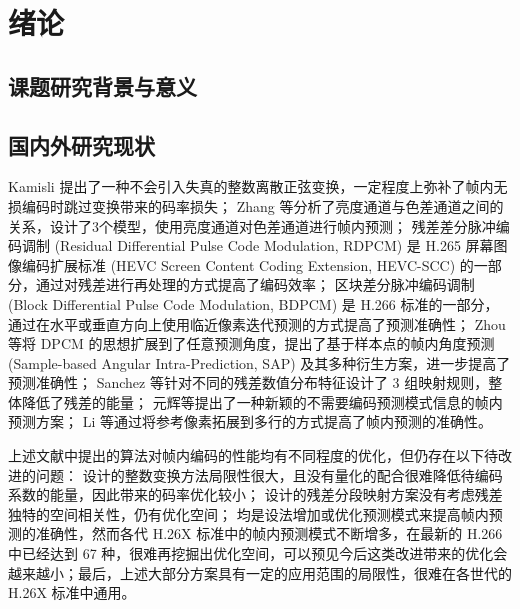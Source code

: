 \chapter{绪论}
\label{cha:c1}

\section{课题研究背景与意义}

\section{国内外研究现状}
Kamisli 提出了一种不会引入失真的整数离散正弦变换，一定程度上弥补了帧内无损编码时跳过变换带来的码率损失；
Zhang 等分析了亮度通道与色差通道之间的关系，设计了3个模型，使用亮度通道对色差通道进行帧内预测；
残差差分脉冲编码调制 (Residual Differential Pulse Code Modulation, RDPCM) 是 H.265 屏幕图像编码扩展标准 (HEVC Screen Content Coding Extension, HEVC-SCC) 的一部分，通过对残差进行再处理的方式提高了编码效率；
区块差分脉冲编码调制 (Block Differential Pulse Code Modulation, BDPCM) 是 H.266 标准的一部分，通过在水平或垂直方向上使用临近像素迭代预测的方式提高了预测准确性；
Zhou 等将 DPCM 的思想扩展到了任意预测角度，提出了基于样本点的帧内角度预测 (Sample-based Angular Intra-Prediction, SAP) 及其多种衍生方案，进一步提高了预测准确性；
Sanchez 等针对不同的残差数值分布特征设计了 3 组映射规则，整体降低了残差的能量；
元辉等提出了一种新颖的不需要编码预测模式信息的帧内预测方案；
Li 等通过将参考像素拓展到多行的方式提高了帧内预测的准确性。

上述文献中提出的算法对帧内编码的性能均有不同程度的优化，但仍存在以下待改进的问题：\cite{LosslessI2ITransformTCSVT} 设计的整数变换方法局限性很大，且没有量化的配合很难降低待编码系数的能量，因此带来的码率优化较小；\cite{pwmResidualsPiecewiseMapping,HEVCSCCOverview} 设计的残差分段映射方案没有考虑残差独特的空间相关性，仍有优化空间；\cite{CrossComponentPredictionCCLM,SAP-SAPE,SAP-SAP1,SAP-SAPHVSWP2DTM,SAP-SAPHV,SAP-SAP,XiDianIntraPredictionH264,EfficientMultiplelinebasedIntra} 均是设法增加或优化预测模式来提高帧内预测的准确性，然而各代 H.26X 标准中的帧内预测模式不断增多，在最新的 H.266 中已经达到 67 种，很难再挖掘出优化空间，可以预见今后这类改进带来的优化会越来越小；最后，上述大部分方案具有一定的应用范围的局限性，很难在各世代的 H.26X 标准中通用。

